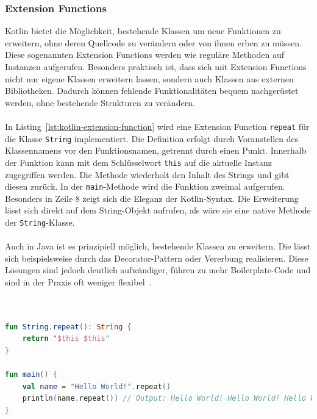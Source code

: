 \documentclass[11pt]{article}
\begin{document}
    \subsubsection{Extension Functions}
    Kotlin bietet die Möglichkeit, bestehende Klassen um neue Funktionen zu erweitern, ohne deren Quellcode zu verändern oder von ihnen erben zu müssen.
    Diese sogenannten Extension Functions werden wie reguläre Methoden auf Instanzen aufgerufen.
    Besonders praktisch ist, dass sich mit Extension Functions nicht nur eigene Klassen erweitern lassen, sondern auch Klassen aus externen Bibliotheken.
    Dadurch können fehlende Funktionalitäten bequem nachgerüstet werden, ohne bestehende Strukturen zu verändern.\\
    \\
    In Listing~\ref{lst:kotlin-extension-function} wird eine Extension Function \texttt{repeat} für die Klasse \texttt{String} implementiert.
    Die Definition erfolgt durch Voranstellen des Klassennamens vor den Funktionsnamen, getrennt durch einen Punkt.
    Innerhalb der Funktion kann mit dem Schlüsselwort \texttt{this} auf die aktuelle Instanz zugegriffen werden.
    Die Methode wiederholt den Inhalt des Strings und gibt diesen zurück.
    In der \texttt{main}-Methode wird die Funktion zweimal aufgerufen.
    Besonders in Zeile 8 zeigt sich die Eleganz der Kotlin-Syntax.
    Die Erweiterung lässt sich direkt auf dem String-Objekt aufrufen, als wäre sie eine native Methode der \texttt{String}-Klasse.\\
    \\
    Auch in Java ist es prinzipiell möglich, bestehende Klassen zu erweitern.
    Die lässt sich beispielsweise durch das Decorator-Pattern oder Vererbung realisieren.
    Diese Lösungen sind jedoch deutlich aufwändiger, führen zu mehr Boilerplate-Code und sind in der Praxis oft weniger flexibel~\cite{kotlin-extensions}.\\
    \\

    \begin{lstlisting}[language=Kotlin, caption={ExtensionFunction.kt}, label={lst:kotlin-extension-function}]

fun String.repeat(): String {
    return "$this $this"
}

fun main() {
    val name = "Hello World!".repeat()
    println(name.repeat()) // Output: Hello World! Hello World! Hello World! Hello World!
}
    \end{lstlisting}
\end{document}
